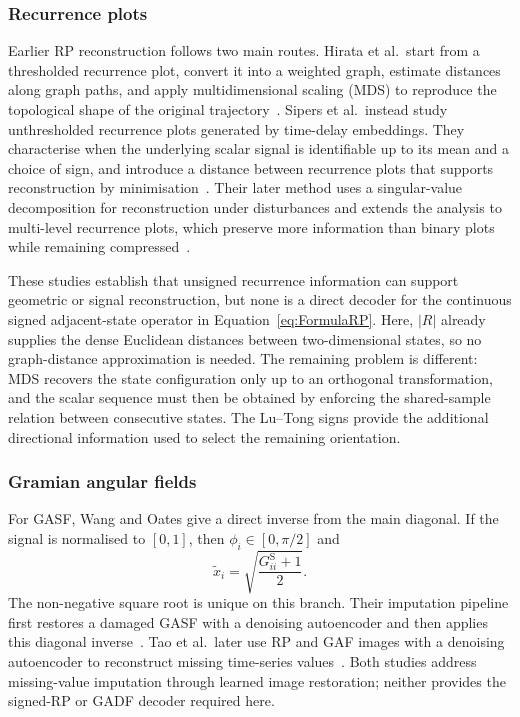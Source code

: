 \documentclass[5p]{elsarticle}
\begin{document}
\subsubsection{Recurrence plots}

Earlier RP reconstruction follows two main routes. Hirata et al.\ start from a thresholded recurrence plot, convert it into a weighted graph, estimate distances along graph paths, and apply multidimensional scaling (MDS) to reproduce the topological shape of the original trajectory~\cite{hirata2008reproduction}. Sipers et al.\ instead study unthresholded recurrence plots generated by time-delay embeddings. They characterise when the underlying scalar signal is identifiable up to its mean and a choice of sign, and introduce a distance between recurrence plots that supports reconstruction by minimisation~\cite{sipers2011unique}. Their later method uses a singular-value decomposition for reconstruction under disturbances and extends the analysis to multi-level recurrence plots, which preserve more information than binary plots while remaining compressed~\cite{sipers2017robust}.

These studies establish that unsigned recurrence information can support geometric or signal reconstruction, but none is a direct decoder for the continuous signed adjacent-state operator in Equation~\ref{eq:FormulaRP}. Here, \(\lvert R\rvert\) already supplies the dense Euclidean distances between two-dimensional states, so no graph-distance approximation is needed. The remaining problem is different: MDS recovers the state configuration only up to an orthogonal transformation, and the scalar sequence must then be obtained by enforcing the shared-sample relation between consecutive states. The Lu--Tong signs provide the additional directional information used to select the remaining orientation.

\subsubsection{Gramian angular fields}

For GASF, Wang and Oates give a direct inverse from the main diagonal. If the signal is normalised to \([0,1]\), then \(\phi_i\in[0,\pi/2]\) and
\[
\tilde{x}_i=\sqrt{\frac{G^{\mathrm{S}}_{ii}+1}{2}}.
\]
The non-negative square root is unique on this branch. Their imputation pipeline first restores a damaged GASF with a denoising autoencoder and then applies this diagonal inverse~\cite{wang2015encoding}. Tao et al.\ later use RP and GAF images with a denoising autoencoder to reconstruct missing time-series values~\cite{huamin2020reconstruction}. Both studies address missing-value imputation through learned image restoration; neither provides the signed-RP or GADF decoder required here.
\end{document}
